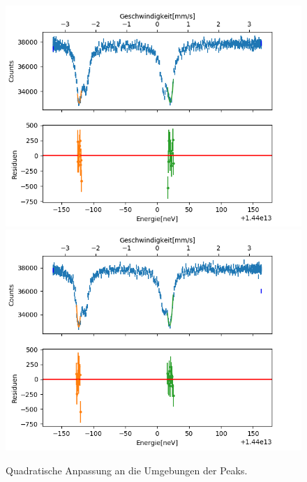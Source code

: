 \documentclass[12pt,a4paper]{article}
\begin{document}
\begin{figure}
\centering
\includegraphics[scale=0.8]{Bilder/Quadrupol/Quad_fit_vor.png}
\includegraphics[scale=0.8]{Bilder/Quadrupol/Quad_fit_nach.png}
\caption{Quadratische Anpassung an die Umgebungen der Peaks.}
\label{fig:Quad_fit}
\end{figure}
\end{document}
